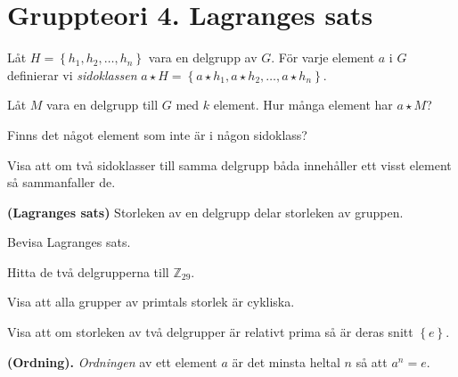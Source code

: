 \documentclass[11pt,fleqn]{book} %
\begin{document}
  \renewcommand*\rmdefault{ppl}\normalfont\upshape

\chapter{Gruppteori 4. Lagranges sats}
\large
\thispagestyle{empty} 

\begin{definition} Låt \(H = \left\{h_1, h_2, \dots, h_n\right\}\) vara en delgrupp av \(G\). För varje element \(a\) i \(G\) definierar vi \textit{sidoklassen} \(a \star H = \left\{a  \star h_1, a \star h_2, \dots, a \star h_n\right\}\).
\end{definition}

\begin{problem}
  Låt \(M\) vara en delgrupp till \(G\) med \(k\) element. Hur många element har \(a  \star M\)?
\end{problem}

\begin{problem} 
	Finns det något element som inte är i någon sidoklass?
\end{problem}

\begin{problem}
	Visa att om två sidoklasser till samma delgrupp båda innehåller ett visst element så sammanfaller de.
\end{problem}

\begin{theoremeT} \textbf{(Lagranges sats)} Storleken av en delgrupp delar storleken av gruppen.
\end{theoremeT} %

\begin{problem}
  Bevisa Lagranges sats.
\end{problem}

\begin{problem}
  Hitta de två delgrupperna till \(\mathbb{Z} _{29}\).
\end{problem}

\begin{problem}
  Visa att alla grupper av primtals storlek är cykliska.
\end{problem}

\begin{problem}
  Visa att om storleken av två delgrupper är relativt prima så är deras snitt \(\left\{e\right\}\).
\end{problem}

\begin{definition} \textbf{(Ordning).} 
  \textit{Ordningen} av ett element \(a\) är det minsta heltal \(n\) så att \(a ^ n = e\). 
\end{definition}
\end{document}
